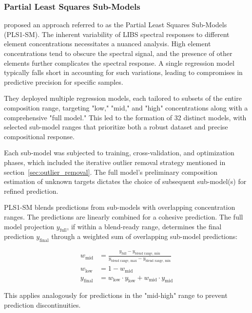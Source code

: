 \subsubsection{Partial Least Squares Sub-Models}\label{sec:pls_submodels}

\citet{andersonImprovedAccuracyQuantitative2017} proposed an approach referred to as the Partial Least Squares Sub-Models (PLS1-SM).
The inherent variability of LIBS spectral responses to different element concentrations necessitates a nuanced analysis. High element concentrations tend to obscure the spectral signal, and the presence of other elements further complicates the spectral response. A single regression model typically falls short in accounting for such variations, leading to compromises in predictive precision for specific samples.

They deployed multiple regression models, each tailored to subsets of the entire composition range, targeting "low," "mid," and "high" concentrations along with a comprehensive "full model." This led to the formation of 32 distinct models, with selected sub-model ranges that prioritize both a robust dataset and precise compositional response.

Each sub-model was subjected to training, cross-validation, and optimization phases, which included the iterative outlier removal strategy mentioned in section~\ref{sec:outlier_removal}. The full model's preliminary composition estimation of unknown targets dictates the choice of subsequent sub-model(s) for refined prediction.

PLS1-SM blends predictions from sub-models with overlapping concentration ranges. The predictions are linearly combined for a cohesive prediction. The full model projection $y_{\text{full}}$, if within a blend-ready range, determines the final prediction $y_{\text{final}}$ through a weighted sum of overlapping sub-model predictions:

\begin{align*}
w_{\text{mid}} &= \frac{y_{\text{full}}-y_{\text{blend range, min}}}{y_{\text{blend range, max}} - y_{\text{blend range, min}}} \\
w_{\text{low}} &= 1 - w_{\text{mid}} \\
y_{\text{final}} &= w_{\text{low}}\cdot y_{\text{low}} + w_{\text{mid}}\cdot y_{\text{mid}}
\end{align*}

This applies analogously for predictions in the "mid-high" range to prevent prediction discontinuities.

